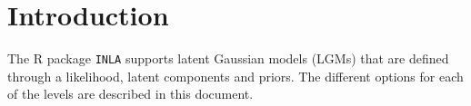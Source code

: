 \documentclass[12pt, a4paper]{book}
\begin{document}
\setcounter{tocdepth}{1}
\tableofcontents
\setcounter{tocdepth}{5}

\chapter{Introduction}
The \textsf{R} package \texttt{INLA} supports latent Gaussian models (LGMs)
that are defined through a likelihood, latent components and priors. The
different options for each of the levels are described in this document.



\end{document}
